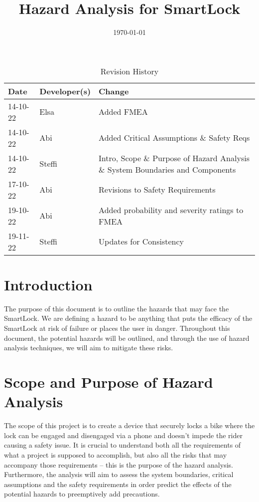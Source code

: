 \documentclass{article}
\title{Hazard Analysis for SmartLock\\\progname}
\author{\authname}
\date{\today}
\begin{document}
\maketitle
\thispagestyle{empty}

\newpage
{}

\begin{table}[hp]
\caption{Revision History} \label{TblRevisionHistory}
\begin{tabularx}{\textwidth}{llX}
\toprule
\textbf{Date} & \textbf{Developer(s)} & \textbf{Change}\\
\midrule
14-10-22 & Elsa & Added FMEA\\
14-10-22 & Abi & Added Critical Assumptions \& Safety Reqs\\
14-10-22 & Steffi & Intro, Scope \& Purpose of Hazard Analysis \& System Boundaries and Components\\
17-10-22 & Abi & Revisions to Safety Requirements\\
19-10-22 & Abi & Added probability and severity ratings to FMEA \\
19-11-22 & Steffi & Updates for Consistency\\
\bottomrule
\end{tabularx}
\end{table}

\newpage


\tableofcontents

\newpage


\section{Introduction}
The purpose of this document is to outline the hazards that may face the SmartLock.  We are defining a hazard to be anything that puts the efficacy of the SmartLock at risk of failure or places the user in danger. 
Throughout this document, the potential hazards will be outlined, and through the use of hazard analysis techniques, we will aim to mitigate these risks. 

\section{Scope and Purpose of Hazard Analysis}

The scope of this project is to create a device that securely locks a bike where the lock can be engaged and disengaged via a phone and doesn’t impede the rider causing a safety issue.  It is crucial to understand both all the requirements of what a project is supposed to accomplish, but also all the risks that may accompany those requirements – this is the purpose of the hazard analysis.  Furthermore, the analysis will aim to assess the system boundaries, critical assumptions and the safety requirements in order predict the effects of the potential hazards to preemptively add precautions. 
\end{document}
